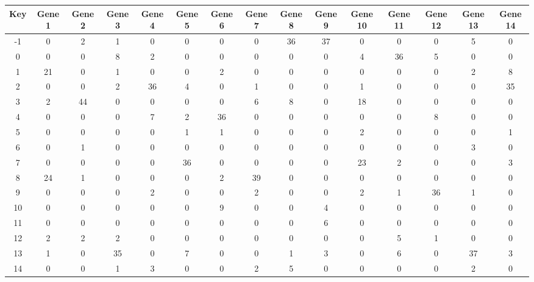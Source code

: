 \begin{tabular}{|c|c|c|c|c|c|c|c|c|c|c|c|c|c|c|}
\hline
Key & Gene 1 & Gene 2 & Gene 3 & Gene 4 & Gene 5 & Gene 6 & Gene 7 & Gene 8 & Gene 9 & Gene 10 & Gene 11 & Gene 12 & Gene 13 & Gene 14 \\
\hline
-1 & 0 & 2 & 1 & 0 & 0 & 0 & 0 & 36 & 37 & 0 & 0 & 0 & 5 & 0 \\
0 & 0 & 0 & 8 & 2 & 0 & 0 & 0 & 0 & 0 & 4 & 36 & 5 & 0 & 0 \\
1 & 21 & 0 & 1 & 0 & 0 & 2 & 0 & 0 & 0 & 0 & 0 & 0 & 2 & 8 \\
2 & 0 & 0 & 2 & 36 & 4 & 0 & 1 & 0 & 0 & 1 & 0 & 0 & 0 & 35 \\
3 & 2 & 44 & 0 & 0 & 0 & 0 & 6 & 8 & 0 & 18 & 0 & 0 & 0 & 0 \\
4 & 0 & 0 & 0 & 7 & 2 & 36 & 0 & 0 & 0 & 0 & 0 & 8 & 0 & 0 \\
5 & 0 & 0 & 0 & 0 & 1 & 1 & 0 & 0 & 0 & 2 & 0 & 0 & 0 & 1 \\
6 & 0 & 1 & 0 & 0 & 0 & 0 & 0 & 0 & 0 & 0 & 0 & 0 & 3 & 0 \\
7 & 0 & 0 & 0 & 0 & 36 & 0 & 0 & 0 & 0 & 23 & 2 & 0 & 0 & 3 \\
8 & 24 & 1 & 0 & 0 & 0 & 2 & 39 & 0 & 0 & 0 & 0 & 0 & 0 & 0 \\
9 & 0 & 0 & 0 & 2 & 0 & 0 & 2 & 0 & 0 & 2 & 1 & 36 & 1 & 0 \\
10 & 0 & 0 & 0 & 0 & 0 & 9 & 0 & 0 & 4 & 0 & 0 & 0 & 0 & 0 \\
11 & 0 & 0 & 0 & 0 & 0 & 0 & 0 & 0 & 6 & 0 & 0 & 0 & 0 & 0 \\
12 & 2 & 2 & 2 & 0 & 0 & 0 & 0 & 0 & 0 & 0 & 5 & 1 & 0 & 0 \\
13 & 1 & 0 & 35 & 0 & 7 & 0 & 0 & 1 & 3 & 0 & 6 & 0 & 37 & 3 \\
14 & 0 & 0 & 1 & 3 & 0 & 0 & 2 & 5 & 0 & 0 & 0 & 0 & 2 & 0 \\
\hline
\end{tabular}